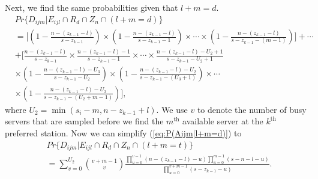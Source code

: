 \documentclass[11pt]{article}\topmargin 0mm
\begin{document}
Next, we find the same probabilities given that $l+m=d$.
\begin{equation}
\label{eq:P(Aijm|l+m=d)}
\begin{split}
& Pr\{D_{ijm}|E_{ijl} \cap R_d \cap Z_n \cap (l+m=d)\} \\
& = \Biggl[\left(1-\frac{n-(z_{k-1}-l)}{s-z_{k-1}}\right)\times \left(1-\frac{n-(z_{k-1}-l)}{s-z_{k-1}-1}\right)\times \cdots \times \left(1-\frac{n-(z_{k-1}-l)}{s-z_{k-1}-(m-1)}\right)\Biggr] + \cdots \\
& + \Biggl[\frac{n-(z_{k-1}-l)}{s-z_{k-1}}\times \frac{n-(z_{k-1}-l)-1}{s-z_{k-1}-1}\times \cdots \times \frac{n-(z_{k-1}-l)-U_2+1}{s-z_{k-1}-U_2+1} \\
& \times \left(1-\frac{n-(z_{k-1}-l)-U_3}{s-z_{k-1}-U_2}\right) \times \left(1-\frac{n-(z_{k-1}-l)-U_2}{s-z_{k-1}-(U_3+1)}\right) \times \cdots \\
& \times \left(1-\frac{n-(z_{k-1}-l)-U_3}{s-z_{k-1}-(U_2+m-1)}\right)\Biggr] ,
\end{split}
\end{equation}
where $U_2=\min(s_i-m,n-z_{k-1}+l)$. We use $v$ to denote the
number of busy servers that are sampled before we find the
$m^\text{th}$ available server at the $k^\text{th}$ preferred
station. Now we can simplify (\ref{eq:P(Aijm|l+m=d)}) to
\begin{equation}
\label{eq:P(Aijm|l+m=d)2}
\begin{split}
& Pr\{D_{ijm}|E_{ijl} \cap R_d \cap Z_n \cap (l+m=t)\} \\
& = \sum_{v=0}^{U_2} {v+m-1 \choose v} \frac{\prod_{u=0}^{v-1} (n-(z_{k-1}-l)-u) \prod_{u=0}^{m-1} (s-n-l-u)}{\prod_{u=0}^{v+m-1}(s-z_{k-1}-u)}.
\end{split}
\end{equation}
\end{document}
